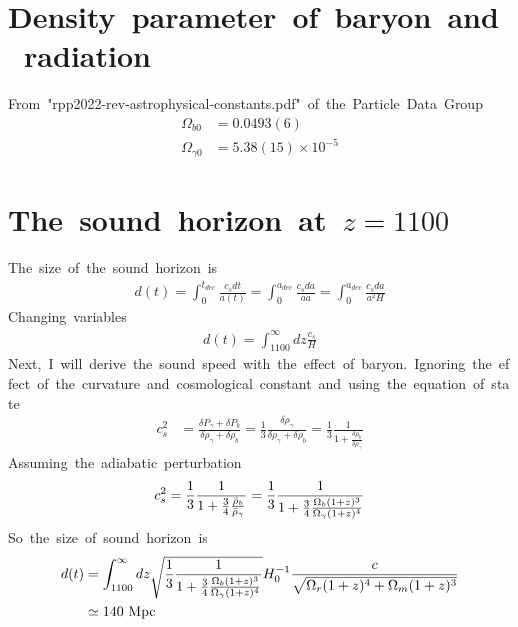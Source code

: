 \section{Density\ parameter\ of\ baryon\ and\ radiation}
From\ "rpp2022-rev-astrophysical-constants.pdf"\ of\ the\ Particle\ Data\ Group
\begin{align}
    \Omega_{b0}&=0.0493(6)\\
    \Omega_{\gamma0}&=5.38(15)\times10^{-5}
\end{align}

\section{The\ sound\ horizon\ at\ $z=1100$}
The\ size\ of\ the\ sound\ horizon\ is
\begin{align*}
    d(t)=\int^{t_{dec}}_{0}\frac{c_sdt}{a(t)}=\int^{a_{dec}}_{0}\frac{c_sda}{a\Dot{a}}=\int^{a_{dec}}_0\frac{c_sda}{a^2H}
\end{align*}
Changing\ variables
\begin{align*}
    d(t)=\int^{\infty}_{1100}dz\frac{c_s}{H}
\end{align*}
Next,\ I\ will\ derive\ the\ sound\ speed\ with\ the\ effect\ of\ baryon.\ Ignoring\ the\ effect\ of\ the\ curvature\ and\ cosmological\ constant\ and\ using\ the\ equation\ of\ state
\begin{align*}
    c_s^2&=\frac{\delta P_{\gamma}+\delta P_{b}}{\delta\rho_{\gamma}+\delta\rho_b}=\frac{1}{3}\frac{\delta\rho_{\gamma}}{\delta\rho_{\gamma}+\delta\rho_b}=\frac{1}{3}\frac{1}{1+\frac{\delta\rho_{b}}{\delta\rho_{\gamma}}}
\end{align*}
Assuming\ the\ adiabatic\ perturbation
\begin{align*}
    c_s^2=\frac{1}{3}\frac{1}{1+\frac{3}{4}\frac{\Bar{\rho}_b}{\Bar{\rho}_{\gamma}}}=\frac{1}{3}\frac{1}{1+\frac{3}{4}\frac{\Omega_b(1+z)^{3}}{\Omega_{\gamma}(1+z)^{4}}}
\end{align*}
So\ the\ size\ of\ sound\ horizon\ is
\begin{align}
    d(t)&=\int^{\infty}_{1100}dz\sqrt{\frac{1}{3}\frac{1}{1+\frac{3}{4}\frac{\Omega_b(1+z)^{3}}{\Omega_{\gamma}(1+z)^{4}}}}H_0^{-1}\frac{c}{\sqrt{\Omega_r(1+z)^4+\Omega_m(1+z)^3}}\nonumber\\
    &\simeq140\ \rm{Mpc}
\end{align}

